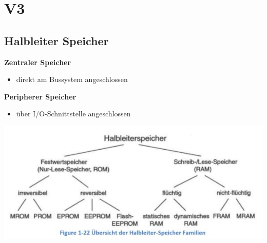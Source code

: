 \section{V3}
\vspace{-0.5cm} 
\begin{multicols}{2}
    \begin{minipage}{\linewidth}
        \subsection{Halbleiter Speicher} 
        \textbf{Zentraler Speicher}
        \begin{itemize}
            \item direkt am Bussystem angeschlossen
        \end{itemize}
        \textbf{Peripherer Speicher}
        \begin{itemize}
            \item über I/O-Schnittstelle angeschlossen
        \end{itemize}
    \end{minipage}
    
    \includegraphics[width=1.1\linewidth]{images/halbleiterfam}
\end{multicols}

